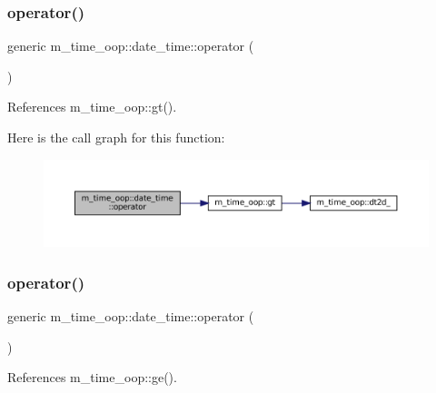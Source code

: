\subsubsection{\texorpdfstring{operator()}{operator()}\hspace{0.1cm}{\footnotesize\ttfamily [4/9]}}
{\footnotesize\ttfamily generic m\+\_\+time\+\_\+oop\+::date\+\_\+time\+::operator (\begin{DoxyParamCaption}{ }\end{DoxyParamCaption})\hspace{0.3cm}{\ttfamily [private]}}



References m\+\_\+time\+\_\+oop\+::gt().

Here is the call graph for this function\+:\nopagebreak
\begin{figure}[H]
\begin{center}
\leavevmode
\includegraphics[width=350pt]{structm__time__oop_1_1date__time_abcf0f17b4e6ba71f0777dc4e4e47de7f_cgraph}
\end{center}
\end{figure}
\mbox{\label{structm__time__oop_1_1date__time_a4c84e88433b8d8bde7671ea0c71cea1f}} 
\subsubsection{\texorpdfstring{operator()}{operator()}\hspace{0.1cm}{\footnotesize\ttfamily [5/9]}}
{\footnotesize\ttfamily generic m\+\_\+time\+\_\+oop\+::date\+\_\+time\+::operator (\begin{DoxyParamCaption}{ }\end{DoxyParamCaption})\hspace{0.3cm}{\ttfamily [private]}}



References m\+\_\+time\+\_\+oop\+::ge().


